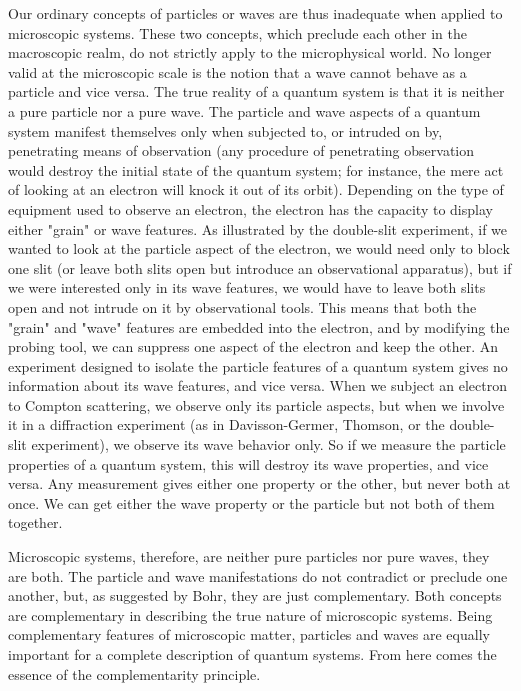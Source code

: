 \documentclass[10pt]{article}
\begin{document}
Our ordinary concepts of particles or waves are thus inadequate when applied to microscopic systems. These two concepts, which preclude each other in the macroscopic realm, do not strictly apply to the microphysical world. No longer valid at the microscopic scale is the notion that a wave cannot behave as a particle and vice versa. The true reality of a quantum system is that it is neither a pure particle nor a pure wave. The particle and wave aspects of a quantum system manifest themselves only when subjected to, or intruded on by, penetrating means of observation (any procedure of penetrating observation would destroy the initial state of the quantum system; for instance, the mere act of looking at an electron will knock it out of its orbit). Depending on the type of equipment used to observe an electron, the electron has the capacity to display either "grain" or wave features. As illustrated by the double-slit experiment, if we wanted to look at the particle aspect of the electron, we would need only to block one slit (or leave both slits open but introduce an observational apparatus), but if we were interested only in its wave features, we would have to leave both slits open and not intrude on it by observational tools. This means that both the "grain" and "wave" features are embedded into the electron, and by modifying the probing tool, we can suppress one aspect of the electron and keep the other. An experiment designed to isolate the particle features of a quantum system gives no information about its wave features, and vice versa. When we subject an electron to Compton scattering, we observe only its particle aspects, but when we involve it in a diffraction experiment (as in Davisson-Germer, Thomson, or the double-slit experiment), we observe its wave behavior only. So if we measure the particle properties of a quantum system, this will destroy its wave properties, and vice versa. Any measurement gives either one property or the other, but never both at once. We can get either the wave property or the particle but not both of them together.

Microscopic systems, therefore, are neither pure particles nor pure waves, they are both. The particle and wave manifestations do not contradict or preclude one another, but, as suggested by Bohr, they are just complementary. Both concepts are complementary in describing the true nature of microscopic systems. Being complementary features of microscopic matter, particles and waves are equally important for a complete description of quantum systems. From here comes the essence of the complementarity principle.
\end{document}
